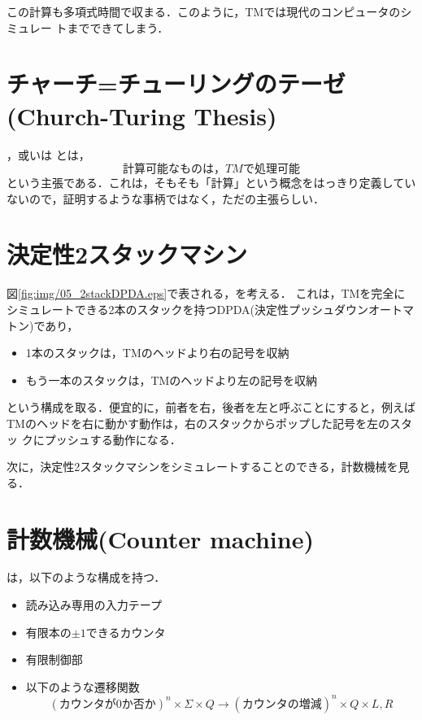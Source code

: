 この計算も多項式時間で収まる．このように，TMでは現代のコンピュータのシミュレー
トまでできてしまう．


\section{チャーチ=チューリングのテーゼ(Church-Turing Thesis)}
，或いは
とは，
\[
 計算可能なものは，TMで処理可能
\]
という主張である．これは，そもそも「計算」という概念をはっきり定義してい
ないので，証明するような事柄ではなく，ただの主張らしい．


\section{決定性2スタックマシン}

図\ref{fig:img/05_2stackDPDA.eps}で表される，を考える．
これは，TMを完全にシミュレートできる2本のスタックを持つDPDA(決定性プッシュダウンオートマトン)であり，
\begin{itemize}
 \item 1本のスタックは，TMのヘッドより右の記号を収納
 \item もう一本のスタックは，TMのヘッドより左の記号を収納
\end{itemize}
という構成を取る．便宜的に，前者を右，後者を左と呼ぶことにすると，例えば
TMのヘッドを右に動かす動作は，右のスタックからポップした記号を左のスタッ
クにプッシュする動作になる．

次に，決定性2スタックマシンをシミュレートすることのできる，計数機械を見る．

\section{計数機械(Counter machine)} \label{sec:05counter}
は，以下のような構成を持つ．
\begin{itemize}
 \item 読み込み専用の入力テープ
 \item 有限本の$\pm 1$できるカウンタ
 \item 有限制御部
 \item 以下のような遷移関数
       \[
       (カウンタが0か否か)^n \times \Sigma \times Q \rightarrow (カウン
       タの増減)^n \times Q \times {L,R}
       \]
\end{itemize}

